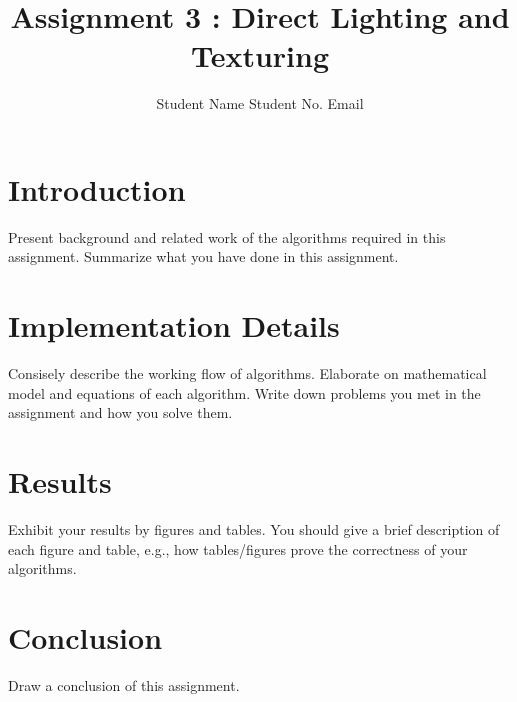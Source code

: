 \documentclass[acmtog]{acmart}
\title{Assignment 3 : Direct Lighting and Texturing}
\author{Student Name \quad Student No. \quad Email}
\begin{document}
\maketitle

\vspace*{2 ex}


\section{Introduction}

Present background and related work of the algorithms required in this assignment. Summarize what you have done in this assignment.

\section{Implementation Details}

Consisely describe the working flow of algorithms. Elaborate on mathematical model and equations of each algorithm. Write down problems you met in the assignment and how you solve them.

\section{Results}

Exhibit your results by figures and tables. You should give a brief description of each figure and table, e.g., how tables/figures prove the correctness of your algorithms.

\section{Conclusion}

Draw a conclusion of this assignment.
\end{document}
